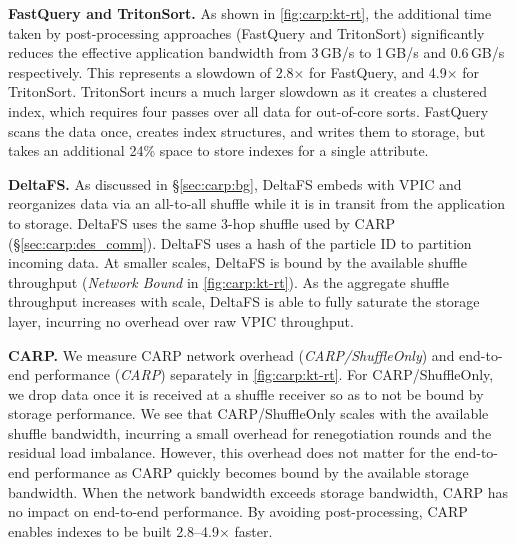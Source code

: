 \textbf{FastQuery and TritonSort.
}
As shown in \cref{fig:carp:kt-rt}, the additional time taken by post-processing approaches
(FastQuery and TritonSort) significantly reduces the effective application bandwidth from 3\,GB/s to
  {\mytexttilde}1\,GB/s and {\mytexttilde}0.6\,GB/s respectively.
This represents a slowdown of 2.8$\times$ for FastQuery, and 4.9$\times$ for TritonSort.
TritonSort incurs a much larger slowdown as it creates a clustered index, which requires four
passes over all data for out-of-core sorts.
FastQuery scans the data once, creates index structures, and writes them to storage, but takes an
additional 24\% space to store indexes for a single attribute.

\textbf{DeltaFS.
}
As discussed in \S\ref{sec:carp:bg}, DeltaFS embeds with VPIC and reorganizes data via an
all-to-all shuffle while it is in transit from the application to storage.
DeltaFS uses the same 3-hop shuffle used by CARP (\S\ref{sec:carp:des_comm}).
DeltaFS uses a hash of the particle ID to partition incoming data.
At smaller scales, DeltaFS is bound by the available shuffle throughput (\emph{Network Bound} in
\cref{fig:carp:kt-rt}).
As the aggregate shuffle throughput increases with scale, DeltaFS is able to fully saturate the
storage layer, incurring no overhead over raw VPIC throughput.

\textbf{CARP.
}
We measure CARP network overhead (\emph{CARP/ShuffleOnly}) and end-to-end performance (\emph{CARP})
separately in \cref{fig:carp:kt-rt}.
For CARP/ShuffleOnly, we drop data once it is received at a shuffle receiver so as to not be bound
by storage performance.
We see that CARP/ShuffleOnly scales with the available shuffle bandwidth, incurring a small
overhead for renegotiation rounds and the residual load imbalance.
However, this overhead does not matter for the end-to-end performance as CARP quickly becomes bound
by the available storage bandwidth.
When the network bandwidth exceeds storage bandwidth, CARP has no impact on end-to-end performance.
By avoiding post-processing, CARP enables indexes to be built 2.8--4.9$\times$ faster.

\vspace{5pt}
\vspace{5pt}


\figevaldyn

